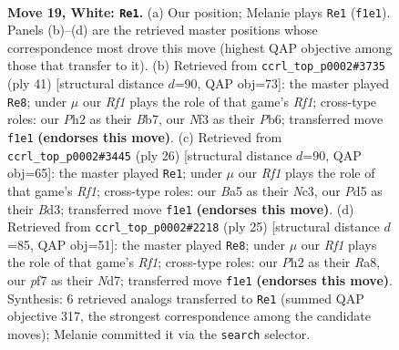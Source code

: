 \documentclass[11pt]{article}
\begin{document}
\clearpage

\begin{figure}[p]\centering
\begin{subfigure}{0.46\textwidth}\centering
\resizebox{\linewidth}{!}{%
\newchessgame
\chessboard[
  setfen={r1bnrk2/1ppp1ppp/p2q4/B2P4/4n3/4PNP1/PP3PBP/1R1Q1RK1 w - - 13 19},
  showmover=false,
  pgfstyle=straightmove, color=movearrow, markmove={f1-e1}
]}
\caption{}
\end{subfigure}\hfill
\begin{subfigure}{0.46\textwidth}\centering
\resizebox{\linewidth}{!}{%
\newchessgame
\chessboard[
  setfen={r2q1rk1/1bp2pp1/1p1p1n1p/pN6/P1PP4/6Q1/1P3PPP/2R1RBK1 b - - 2 21},
  showmover=false,
  pgfstyle=straightmove, color=movearrow, markmove={f8-e8}
]}
\caption{}
\end{subfigure}
\\[4pt]
\begin{subfigure}{0.46\textwidth}\centering
\resizebox{\linewidth}{!}{%
\newchessgame
\chessboard[
  setfen={r1b1k2r/3p1ppp/pp2p3/2q1n3/2P1P3/2NB3P/PP3PP1/R2Q1RK1 w kq - 0 14},
  showmover=false,
  pgfstyle=straightmove, color=movearrow, markmove={f1-e1}
]}
\caption{}
\end{subfigure}\hfill
\begin{subfigure}{0.46\textwidth}\centering
\resizebox{\linewidth}{!}{%
\newchessgame
\chessboard[
  setfen={r2q1rk1/1p1n1ppp/p1p2b2/3p4/1P1P4/P1NQPN2/5PPP/R4RK1 b - - 3 13},
  showmover=false,
  pgfstyle=straightmove, color=movearrow, markmove={f8-e8}
]}
\caption{}
\end{subfigure}
\caption{\textbf{Move 19, White: \texttt{Re1}.} (a) Our position; Melanie plays \texttt{Re1} (\texttt{f1e1}). Panels (b)--(d) are the retrieved master positions whose correspondence most drove this move (highest QAP objective among those that transfer to it). (b) Retrieved from \texttt{ccrl\_top\_p0002\#3735} (ply 41) [structural distance $d$=90, QAP obj=73]: the master played \texttt{Re8}; under $\mu$ our \emph{Rf1} plays the role of that game's \emph{Rf1}; cross-type roles: our \emph{P}h2 as their \emph{B}b7, our \emph{N}f3 as their \emph{P}b6; transferred move \texttt{f1e1} \textbf{(endorses this move)}. (c) Retrieved from \texttt{ccrl\_top\_p0002\#3445} (ply 26) [structural distance $d$=90, QAP obj=65]: the master played \texttt{Re1}; under $\mu$ our \emph{Rf1} plays the role of that game's \emph{Rf1}; cross-type roles: our \emph{B}a5 as their \emph{N}c3, our \emph{P}d5 as their \emph{B}d3; transferred move \texttt{f1e1} \textbf{(endorses this move)}. (d) Retrieved from \texttt{ccrl\_top\_p0002\#2218} (ply 25) [structural distance $d$=85, QAP obj=51]: the master played \texttt{Re8}; under $\mu$ our \emph{Rf1} plays the role of that game's \emph{Rf1}; cross-type roles: our \emph{P}h2 as their \emph{R}a8, our \emph{p}f7 as their \emph{N}d7; transferred move \texttt{f1e1} \textbf{(endorses this move)}. Synthesis: 6 retrieved analogs transferred to \texttt{Re1} (summed QAP objective 317, the strongest correspondence among the candidate moves); Melanie committed it via the \texttt{search} selector.}
\label{fig:thought-m36}
\end{figure}
\end{document}
